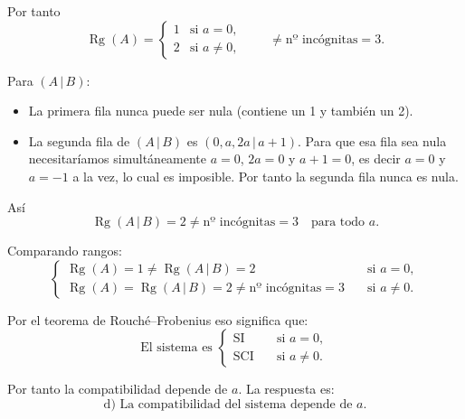 \documentclass[a4paper,12pt]{article}
\begin{document}
\begin{ejercicio}[title=Ejercicio 28]
Por tanto
\[
\operatorname{Rg}(A)=
\begin{cases}
1 & \text{si } a=0,\\[4pt]
2 & \text{si } a\neq 0,
\end{cases}
\qquad \neq \text{nº incógnitas} = 3.
\]

\vspace{0.5em}

Para \((A\,|\,B)\):

\begin{itemize}
\item La primera fila nunca puede ser nula (contiene un 1 y también un 2).
\item La segunda fila de \((A\,|\,B)\) es \((0,a,2a\,|\,a+1)\). Para que esa fila sea nula necesitaríamos simultáneamente \(a=0\), \(2a=0\) y \(a+1=0\), es decir \(a=0\) y \(a=-1\) a la vez, lo cual es imposible. Por tanto la segunda fila nunca es nula.
\end{itemize}

Así
\[
\operatorname{Rg}(A\,|\,B)=2 \neq \text{nº incógnitas} = 3 \quad\text{para todo }a.
\]
\end{ejercicio}
\begin{ejercicio}[title=Ejercicio 28]
Comparando rangos:
\[
\begin{cases}
\operatorname{Rg}(A)=1\ne\operatorname{Rg}(A\,|\,B)= 2 \quad &\text{si } a=0,\\[4pt]
\operatorname{Rg}(A)= \operatorname{Rg}(A\,|\,B) = 2 \neq \text{nº incógnitas} = 3\quad &\text{si } a\neq 0.
\end{cases}
\]

Por el teorema de Rouché–Frobenius eso significa que:
\[
\text{El sistema es }
\begin{cases}
\text{SI} \quad &\text{si } a=0,\\[4pt]
\text{SCI}\quad &\text{si } a\neq 0.
\end{cases}
\]

Por tanto la compatibilidad depende de \(a\). La respuesta es:
\[
\boxed{\text{d) La compatibilidad del sistema depende de }a.}
\]
\end{ejercicio}
\end{document}
